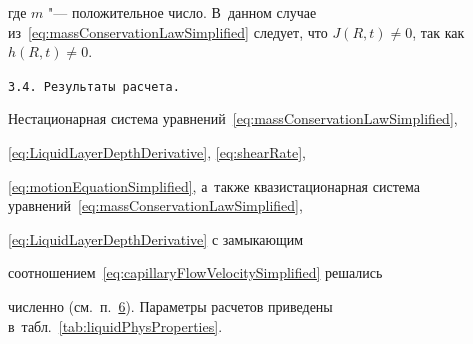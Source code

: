 где $m$ "--- положительное число. В~данном случае из~\eqref{eq:massConservationLawSimplified} следует, что ${J(R,

t)\neq 0}$, так как $h(R, t)\neq 0$.



\smallskip



\texttt{3.4. Результаты расчета.} 

Нестационарная система уравнений~\eqref{eq:massConservationLawSimplified},

\eqref{eq:LiquidLayerDepthDerivative}, \eqref{eq:shearRate},

\eqref{eq:motionEquationSimplified}, а~также квазистационарная система уравнений~\eqref{eq:massConservationLawSimplified},

\eqref{eq:LiquidLayerDepthDerivative} с замыкающим

соотношением~\eqref{eq:capillaryFlowVelocitySimplified} решались

численно (см.~п.~\hyperlink{kol:6}{6}). Параметры расчетов приведены в~табл.~\ref{tab:liquidPhysProperties}.



